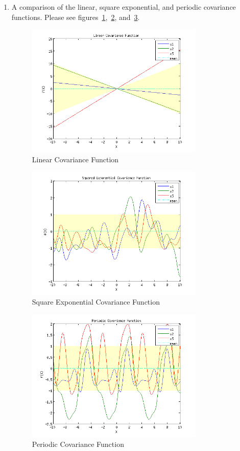 \documentclass{article}
\begin{document}
\begin{enumerate}[label=(\alph*)]
\item A comparison of the linear, square exponential, and periodic covariance functions. 
Please see figures~\ref{fig:1a1},~\ref{fig:1a2}, and~\ref{fig:1a3}.
\begin{figure}[H]
\centering
\includegraphics[width=0.8\textwidth]{1_a_1.png}
\caption{Linear Covariance Function}
\label{fig:1a1}
\end{figure}
\begin{figure}[H]
\centering
\includegraphics[width=0.8\textwidth]{1_a_2.png}
\caption{Square Exponential Covariance Function}
\label{fig:1a2}
\end{figure}
\begin{figure}[H]
\centering
\includegraphics[width=0.8\textwidth]{1_a_3.png}
\caption{Periodic Covariance Function}
\label{fig:1a3}
\end{figure}


\end{enumerate}
\end{document}
